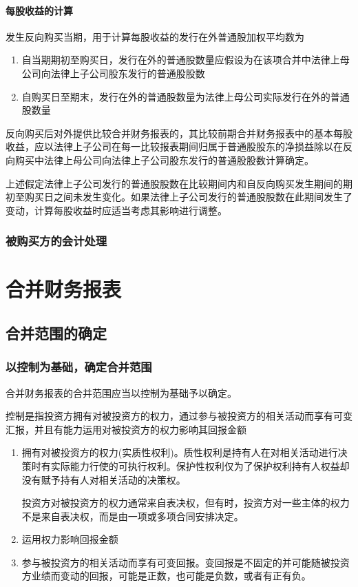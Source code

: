 \documentclass[UTF8,12pt]{ctexart}
\numberwithin{equation}{section} %
\numberwithin{figure}{section}
\numberwithin{table}{section}
\begin{document}
	\paragraph{每股收益的计算}
	
	发生反向购买当期，用于计算每股收益的发行在外普通股加权平均数为
	\begin{enumerate}
		\item 自当期期初至购买日，发行在外的普通股数量应假设为在该项合并中法律上母公司向法律上子公司股东发行的普通股股数
		
		\item 自购买日至期末，发行在外的普通股数量为法律上母公司实际发行在外的普通股数量
	\end{enumerate}
	反向购买后对外提供比较合并财务报表的，其比较前期合并财务报表中的基本每股收益，应以法律上子公司在每一比较报表期间归属于普通股股东的净损益除以在反向购买中法律上母公司向法律上子公司股东发行的普通股股数计算确定。
	
	上述假定法律上子公司发行的普通股股数在比较期间内和自反向购买发生期间的期初至购买日之间未发生变化。如果法律上子公司发行的普通股股数在此期间发生了变动，计算每股收益时应适当考虑其影响进行调整。
	
	\subsubsection{被购买方的会计处理}
	
	\newpage
	
	\section{合并财务报表}
	\subsection{合并范围的确定}
	\subsubsection{以控制为基础，确定合并范围}
	合并财务报表的合并范围应当以控制为基础予以确定。
	
	控制是指投资方拥有对被投资方的权力，通过参与被投资方的相关活动而享有可变汇报，并且有能力运用对被投资方的权力影响其回报金额
	\begin{enumerate}
		\item 拥有对被投资方的权力(实质性权利)。质性权利是持有人在对相关活动进行决策时有实际能力行使的可执行权利。保护性权利仅为了保护权利持有人权益却没有赋予持有人对相关活动的决策权。
		
		投资方对被投资方的权力通常来自表决权，但有时，投资方对一些主体的权力不是来自表决权，而是由一项或多项合同安排决定。
		
		\item 运用权力影响回报金额
		
		\item 参与被投资方的相关活动而享有可变回报。变回报是不固定的并可能随被投资方业绩而变动的回报，可能是正数，也可能是负数，或者有正有负。
	\end{enumerate}
	
\end{document}
